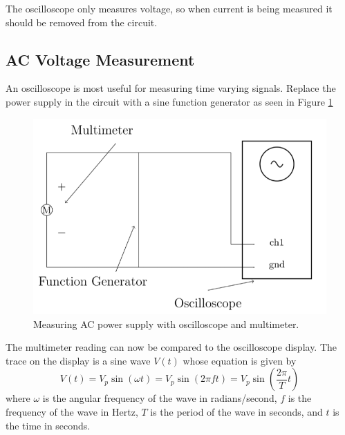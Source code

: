 \documentclass[12pt, a4paper, oneside, openright, titlepage]{book}
\begin{document}
\begin{note}
    The oscilloscope only measures voltage, so when current is being measured it should be removed from the circuit.
\end{note}

\subsection{AC Voltage Measurement}

An oscilloscope is most useful for measuring time varying signals. Replace the power supply in the circuit with a sine function generator as seen in Figure \ref{fig:ACDC3}

\begin{figure}[H]
    \centering
    \includegraphics[scale = 0.8]{Images/ACDC2.PNG}
    \caption{Measuring AC power supply with oscilloscope and multimeter.}
    \label{fig:ACDC3}
\end{figure}

The multimeter reading can now be compared to the oscilloscope display. The trace on the display is a sine wave $V(t)$ whose equation is given by \begin{equation}\label{eq:ACDC1}
    V(t) = V_p\sin(\omega t) = V_p\sin(2\pi ft) = V_p\sin\left(\frac{2\pi}{T}t\right)
\end{equation}
where $\omega$ is the angular frequency of the wave in radians/second, $f$ is the frequency of the wave in Hertz, $T$ is the period of the wave in seconds, and $t$ is the time in seconds.
\end{document}
